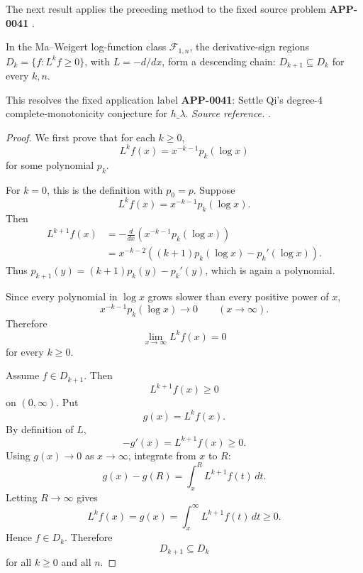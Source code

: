 The next result applies the preceding method to the fixed source problem \textbf{APP-0041} \cite{qi-hlambda}.
\begin{proposition}
\label{res:ma-weigert-log-function-dk-chain-conjecture}
In the Ma--Weigert log-function class \(\mathcal F_{1,n}\), the derivative-sign regions \(D_k=\{f:L^k f\ge0\}\), with \(L=-d/dx\), form a descending chain: \(D_{k+1}\subseteq D_k\) for every \(k,n\).

This resolves the fixed application label \textbf{APP-0041}: Settle Qi's degree-4 complete-monotonicity conjecture for \(h\_\lambda\).
\emph{Source reference.} \cite{qi-hlambda}.
\end{proposition}
\begin{proof}
We first prove that for each \(k\ge0\),
\[
L^k f(x)=x^{-k-1}p_k(\log x)
\]
for some polynomial \(p_k\).

For \(k=0\), this is the definition with \(p_0=p\).  Suppose
\[
L^k f(x)=x^{-k-1}p_k(\log x).
\]
Then
\[
\begin{aligned}
L^{k+1}f(x)
&=-\frac{d}{dx}\left(x^{-k-1}p_k(\log x)\right)\\
&=x^{-k-2}\left((k+1)p_k(\log x)-p_k'(\log x)\right).
\end{aligned}
\]
Thus \(p_{k+1}(y)=(k+1)p_k(y)-p_k'(y)\), which is again a polynomial.

Since every polynomial in \(\log x\) grows slower than every positive power of \(x\),
\[
x^{-k-1}p_k(\log x)\to0
\qquad (x\to\infty).
\]
Therefore
\[
\lim_{x\to\infty}L^k f(x)=0
\]
for every \(k\ge0\).

Assume \(f\in D_{k+1}\).  Then
\[
L^{k+1}f(x)\ge0
\]
on \((0,\infty)\).  Put
\[
g(x)=L^k f(x).
\]
By definition of \(L\),
\[
-g'(x)=L^{k+1}f(x)\ge0.
\]
Using \(g(x)\to0\) as \(x\to\infty\), integrate from \(x\) to \(R\):
\[
g(x)-g(R)=\int_x^R L^{k+1}f(t)\,dt.
\]
Letting \(R\to\infty\) gives
\[
L^k f(x)=g(x)=\int_x^\infty L^{k+1}f(t)\,dt\ge0.
\]
Hence \(f\in D_k\).  Therefore
\[
D_{k+1}\subseteq D_k
\]
for all \(k\ge0\) and all \(n\).
\end{proof}

